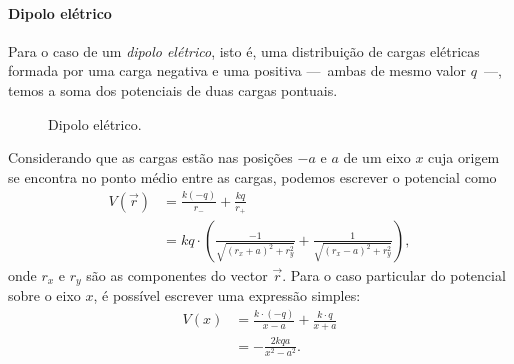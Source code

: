 \paragraph{Dipolo elétrico}

Para o caso de um \emph{dipolo elétrico}, isto é, uma distribuição de cargas elétricas formada por uma carga negativa e uma positiva ---~ambas de mesmo valor $q$~---, temos a soma dos potenciais de duas cargas pontuais.
\begin{figure}[h]
\centering
{}
\caption{Dipolo elétrico.}
\end{figure}

\noindent{}Considerando que as cargas estão nas posições $-a$ e $a$ de um eixo $x$ cuja origem se encontra no ponto médio entre as cargas, podemos escrever o potencial como
\begin{align}
    V(\vec{r}) &= \frac{k(-q)}{r_{-}} + \frac{kq}{r_{+}} \\
    &= kq \cdot\left(\frac{-1}{\sqrt{(r_x+a)^2 + r_y^2}} + \frac{1}{\sqrt{(r_x-a)^2 + r_y^2}}\right), \label{Eq:PotDipoloEletricoXY}
\end{align}
%
onde $r_x$ e $r_y$ são as componentes do vector $\vec{r}$. Para o caso particular do potencial sobre o eixo $x$, é possível escrever uma expressão simples:
\begin{align}
    V(x) &= \frac{k\cdot(-q)}{x-a} + \frac{k\cdot q}{x + a} \\
    &= -\frac{2kqa}{x^2 - a^2}.
\end{align}


